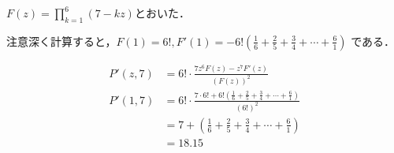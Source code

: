 \documentclass[a4j]{jarticle}
\let \ds \displaystyle
\begin{document}
$\ds F(z) = \prod_{k=1}^6 (7-kz)$とおいた．

注意深く計算すると，$F(1)=6!,F'(1)=-6!\left(\frac{1}{6}+\frac{2}{5}+\frac{3}{4}+\cdots+\frac{6}{1}\right)$ 
である．

\begin{align*}
 P'(z,7) &= 6! \cdot \frac{7z^6F(z) - z^7 F'(z) }{(F(z))^2} \\
 P'(1,7) &= 6! \cdot \frac{7\cdot 6! + 6!\left(\frac{1}{6}+\frac{2}{5}+\frac{3}{4}+\cdots+\frac{6}{1}\right) }{(6!)^2} \\
 &= 7 + \left(\frac{1}{6}+\frac{2}{5}+\frac{3}{4}+\cdots+\frac{6}{1}\right) \\
 &= 18.15
\end{align*}
\end{document}
